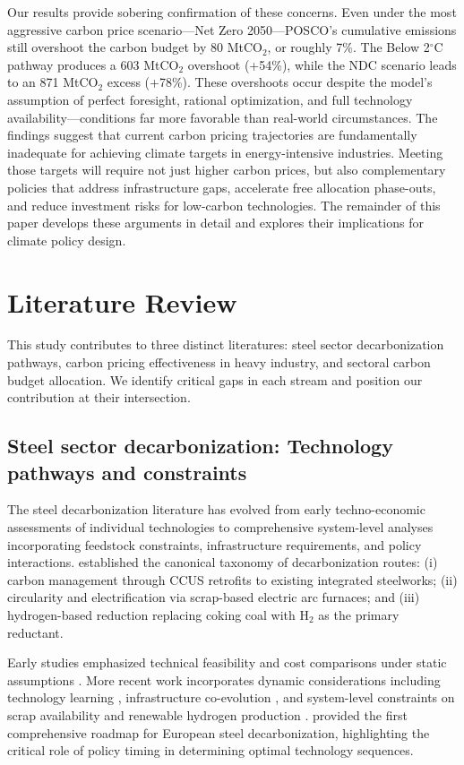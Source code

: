\documentclass[preprint,1p,authoryear]{elsarticle}
\begin{document}
Our results provide sobering confirmation of these concerns. Even under the most aggressive carbon price scenario—Net Zero 2050—POSCO's cumulative emissions still overshoot the carbon budget by 80 MtCO$_2$, or roughly 7\%. The Below 2$^\circ$C pathway produces a 603 MtCO$_2$ overshoot (+54\%), while the NDC scenario leads to an 871 MtCO$_2$ excess (+78\%). These overshoots occur despite the model's assumption of perfect foresight, rational optimization, and full technology availability—conditions far more favorable than real-world circumstances. The findings suggest that current carbon pricing trajectories are fundamentally inadequate for achieving climate targets in energy-intensive industries. Meeting those targets will require not just higher carbon prices, but also complementary policies that address infrastructure gaps, accelerate free allocation phase-outs, and reduce investment risks for low-carbon technologies. The remainder of this paper develops these arguments in detail and explores their implications for climate policy design.
\section{Literature Review}

This study contributes to three distinct literatures: steel sector decarbonization pathways, carbon pricing effectiveness in heavy industry, and sectoral carbon budget allocation. We identify critical gaps in each stream and position our contribution at their intersection.

\subsection{Steel sector decarbonization: Technology pathways and constraints}

The steel decarbonization literature has evolved from early techno-economic assessments of individual technologies to comprehensive system-level analyses incorporating feedstock constraints, infrastructure requirements, and policy interactions. \citet{IEA2020steel} established the canonical taxonomy of decarbonization routes: (i) carbon management through CCUS retrofits to existing integrated steelworks; (ii) circularity and electrification via scrap-based electric arc furnaces; and (iii) hydrogen-based reduction replacing coking coal with H$_2$ as the primary reductant.

Early studies emphasized technical feasibility and cost comparisons under static assumptions \citep{Vogl2018, Otto2017}. More recent work incorporates dynamic considerations including technology learning \citep{prammer2021steel}, infrastructure co-evolution \citep{ueckerdt2021potential}, and system-level constraints on scrap availability \citep{pauliuk2013global} and renewable hydrogen production \citep{wang2021hydrogen}. \citet{MaterialEconomics2019} provided the first comprehensive roadmap for European steel decarbonization, highlighting the critical role of policy timing in determining optimal technology sequences.
\end{document}
